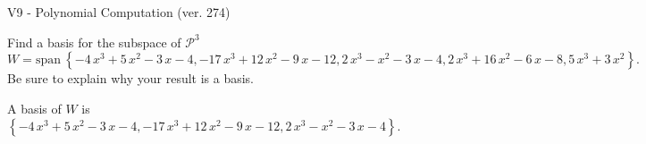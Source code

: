 \begin{exercise}
  \begin{exerciseTitle}V9 - Polynomial Computation (ver. 274)\end{exerciseTitle}
  \begin{exerciseStatement}
    Find a basis for the subspace of \(\mathcal{P}^3\) 
\[W=\mathrm{span}\ \left\{-4 \, x^{3} + 5 \, x^{2} - 3 \, x - 4 , -17 \, x^{3} + 12 \, x^{2} - 9 \, x - 12 , 2 \, x^{3} - x^{2} - 3 \, x - 4 , 2 \, x^{3} + 16 \, x^{2} - 6 \, x - 8 , 5 \, x^{3} + 3 \, x^{2}\right\}.\]
 Be sure to explain why your result is a basis.


  \end{exerciseStatement}
  \begin{exerciseAnswer}
   A basis of \(W\) is  \(\left\{-4 \, x^{3} + 5 \, x^{2} - 3 \, x - 4 , -17 \, x^{3} + 12 \, x^{2} - 9 \, x - 12 , 2 \, x^{3} - x^{2} - 3 \, x - 4\right\}\).
  


  \end{exerciseAnswer}
\end{exercise}